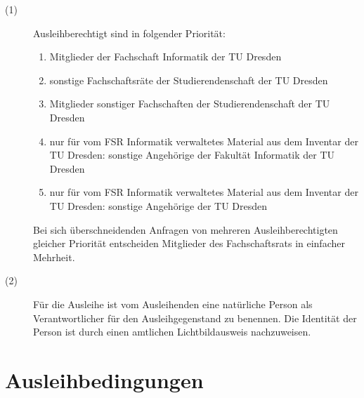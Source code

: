 \documentclass[a4paper]{article}
\newcommand{\iFSR}{FSR Informatik}
\newcommand{\TUD}{TU Dresden}
\begin{document}
\begin{description}
\item[(1)] Ausleihberechtigt sind in folgender Priorität:

\begin{enumerate}
\item Mitglieder der Fachschaft Informatik der \TUD
\item sonstige Fachschaftsräte der Studierendenschaft der \TUD
\item Mitglieder sonstiger Fachschaften der Studierendenschaft der \TUD
\item nur für vom \iFSR{} verwaltetes Material aus dem Inventar der \TUD: sonstige Angehörige der Fakultät Informatik der \TUD
\item nur für vom \iFSR{} verwaltetes Material aus dem Inventar der \TUD: sonstige Angehörige der \TUD
\end{enumerate}

Bei sich überschneidenden Anfragen von mehreren Ausleihberechtigten gleicher Priorität entscheiden Mitglieder des Fachschaftsrats in einfacher Mehrheit.

\item[(2)] Für die Ausleihe ist vom Ausleihenden eine natürliche Person als Verantwortlicher für den Ausleihgegenstand zu benennen. Die Identität der Person ist durch einen amtlichen Lichtbildausweis nachzuweisen.
\end{description}

\section{Ausleihbedingungen}
\end{document}
